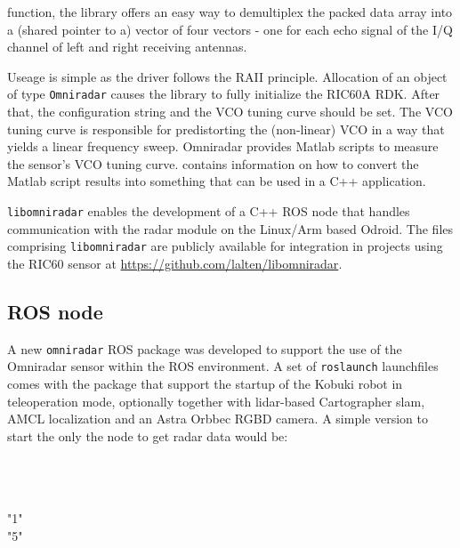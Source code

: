 function, the library offers an easy way to demultiplex the packed data
array into a (shared pointer to a) vector of four vectors - one for each
echo signal of the I/Q channel of left and right receiving antennas.

Useage is simple as the driver follows the RAII principle. Allocation of
an object of type \texttt{Omniradar} causes the library to fully
initialize the RIC60A RDK. After that, the configuration string and the
VCO tuning curve should be set. The VCO tuning curve is responsible for predistorting the (non-linear) VCO in a way that yields a linear frequency sweep.
Omniradar provides Matlab scripts to measure the sensor's VCO tuning curve.  contains information on how to convert the Matlab script results into something that can be used in a C++ application.

\texttt{libomniradar} enables the development of a C++ ROS node that handles
communication with the radar module on the Linux/Arm based Odroid.
The files comprising \texttt{libomniradar} are publicly available for integration in projects using the RIC60 sensor at \url{https://github.com/lalten/libomniradar}.

\subsection{ROS node}\label{ros-node}
A new \texttt{omniradar} ROS package was developed to support the use of
the Omniradar sensor within the ROS environment. A set of
\texttt{roslaunch} launchfiles comes with the package that support the
startup of the Kobuki robot in teleoperation mode, optionally together
with lidar-based Cartographer slam, AMCL localization and an Astra
Orbbec RGBD camera. A simple version to start the only the node to get
radar data would be:

\begin{Shaded}
\begin{Highlighting}[]
\\
    \\
\NormalTok{    }\NormalTok{>}\\
 "1"\NormalTok{ />}\\
  "5"\NormalTok{ />}\\
\\
\end{Highlighting}
\end{Shaded}

